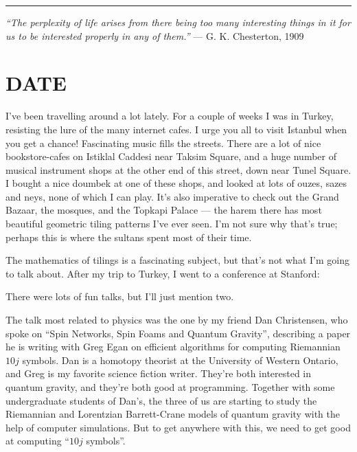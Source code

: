 \documentclass{article}
\def\tightlist{}
\renewcommand{\texttt}[1]{%
  \begingroup
  \ttfamily
  \begingroup\lccode`~=`/\lowercase{\endgroup\def~}{/\discretionary{}{}{}}%
  \begingroup\lccode`~=`[\lowercase{\endgroup\def~}{[\discretionary{}{}{}}%
  \begingroup\lccode`~=`.\lowercase{\endgroup\def~}{.\discretionary{}{}{}}%
  \catcode`/=\active\catcode`[=\active\catcode`.=\active
  \scantokens{#1\noexpand}%
  \endgroup
}
\begin{document}
\begin{center}\rule{0.5\linewidth}{0.5pt}\end{center}

\emph{``The perplexity of life arises from there being too many
interesting things in it for us to be interested properly in any of
them.''} --- G. K. Chesterton, 1909
\hypertarget{week170}{%
\section{DATE}\label{week170}}

I've been travelling around a lot lately. For a couple of weeks I was in
Turkey, resisting the lure of the many internet cafes. I urge you all to
visit Istanbul when you get a chance! Fascinating music fills the
streets. There are a lot of nice bookstore-cafes on Istiklal Caddesi
near Taksim Square, and a huge number of musical instrument shops at the
other end of this street, down near Tunel Square. I bought a nice
doumbek at one of these shops, and looked at lots of ouzes, sazes and
neys, none of which I can play. It's also imperative to check out the
Grand Bazaar, the mosques, and the Topkapi Palace --- the harem there
has most beautiful geometric tiling patterns I've ever seen. I'm not
sure why that's true; perhaps this is where the sultans spent most of
their time.

The mathematics of tilings is a fascinating subject, but that's not what
I'm going to talk about. After my trip to Turkey, I went to a conference
at Stanford:


There were lots of fun talks, but I'll just mention two.

The talk most related to physics was the one by my friend Dan
Christensen, who spoke on ``Spin Networks, Spin Foams and Quantum
Gravity'', describing a paper he is writing with Greg Egan on efficient
algorithms for computing Riemannian \(10j\) symbols. Dan is a homotopy
theorist at the University of Western Ontario, and Greg is my favorite
science fiction writer. They're both interested in quantum gravity, and
they're both good at programming. Together with some undergraduate
students of Dan's, the three of us are starting to study the Riemannian
and Lorentzian Barrett-Crane models of quantum gravity with the help of
computer simulations. But to get anywhere with this, we need to get good
at computing ``\(10j\) symbols''.
\end{document}
